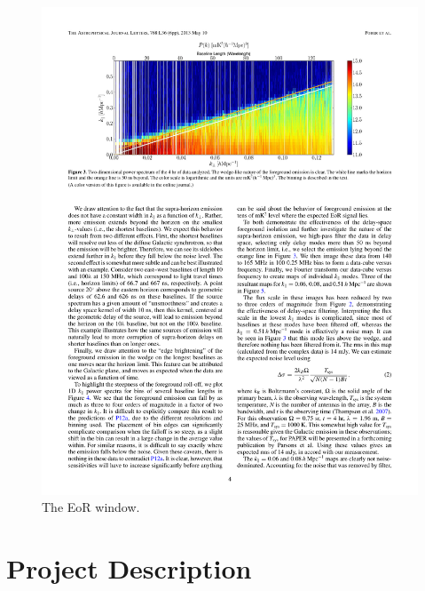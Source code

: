 \documentclass[preprint]{aastex}
\begin{document}
\begin{figure}\centering
\includegraphics{plots/Pober_wedge.pdf}
\caption{\small
The EoR window.
}\label{fig:EoRwindow}
\end{figure}


\vspace{-0.25in}
\section{Project Description}
\label{PDsec}
\end{document}
